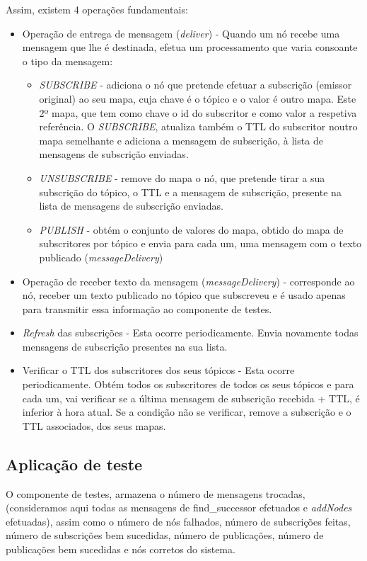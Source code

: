 \documentclass[12pt]{article}
\begin{document}
Assim, existem 4 operações fundamentais:

\begin{itemize}
\item Operação de entrega de mensagem (\emph{deliver}) - Quando um nó recebe uma mensagem que lhe é destinada, efetua um processamento que varia consoante o tipo da mensagem:
\begin{itemize}
\item \emph{SUBSCRIBE} - adiciona o nó que pretende efetuar a subscrição (emissor original) ao seu mapa, cuja chave é o tópico e o valor é outro mapa. Este 2º mapa, que tem como chave o id do subscritor e como valor a respetiva referência. O \emph{SUBSCRIBE}, atualiza também o TTL do subscritor noutro mapa semelhante e adiciona a mensagem de subscrição, à lista de mensagens de subscrição enviadas.
\item \emph{UNSUBSCRIBE} - remove do mapa o nó, que pretende tirar a sua subscrição do tópico, o TTL e a mensagem de subscrição, presente na lista de mensagens de subscrição enviadas.
\item \emph{PUBLISH} - obtém o conjunto de valores do mapa, obtido do mapa de subscritores por tópico e envia para cada um, uma mensagem com o texto publicado (\emph{messageDelivery})
\end{itemize}
\item Operação de receber texto da mensagem (\emph{messageDelivery}) - corresponde ao nó, receber um texto publicado no tópico que subscreveu e é usado apenas para transmitir essa informação ao componente de testes.
\item \emph{Refresh} das subscrições - Esta ocorre periodicamente. Envia novamente todas mensagens de subscrição presentes na sua lista.
\item Verificar o TTL dos subscritores dos seus tópicos - Esta ocorre periodicamente. Obtém todos os subscritores de todos os seus tópicos e para cada um, vai verificar se a última mensagem de subscrição recebida + TTL, é inferior à hora atual. Se a condição não se verificar, remove a subscrição e o TTL associados, dos seus mapas.
\end{itemize}

\newpage
\subsection{Aplicação de teste}

O componente de testes, armazena o número de mensagens trocadas, (consideramos aqui todas as mensagens de find\_successor efetuados e \emph{addNodes} efetuadas), assim como o número de nós falhados, número de subscrições feitas, número de subscrições bem sucedidas, número de publicações, número de publicações bem sucedidas e nós corretos do sistema.
\end{document}
